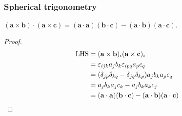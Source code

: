 \documentclass[a4paper]{article}
\begin{document}
\subsubsection*{Spherical trigonometry}
\begin{prop}
  $\mathbf{(a\times b)\cdot (a\times c) = (a\cdot a)(b\cdot c) - (a\cdot b)(a\cdot c)}$.
\end{prop}
\begin{proof}
  \begin{align*}
    \text{LHS} &= (\mathbf{a\times b})_i(\mathbf{a\times c})_i\\
    &= \varepsilon_{ijk}a_jb_k\varepsilon_{ipq} a_pc_q\\
    &= (\delta_{jp}\delta_{kq} - \delta_{jq}\delta_{kp})a_jb_ka_pc_q\\
    &= a_jb_k a_jc_k - a_j b_k a_k c_j\\
    &= \mathbf{(a\cdot a)(b\cdot c) - (a\cdot b)(a\cdot c)}\qedhere
  \end{align*}
\end{proof}
\end{document}

